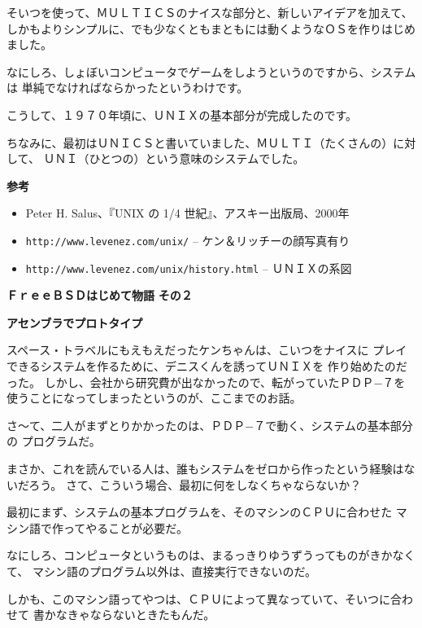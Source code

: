 \documentclass[12pt]{jarticle}
\begin{document}
そいつを使って、ＭＵＬＴＩＣＳのナイスな部分と、新しいアイデアを加えて、
しかもよりシンプルに、でも少なくともまともには動くようなＯＳを作りはじめました。

なにしろ、しょぼいコンピュータでゲームをしようというのですから、システムは
単純でなければならかったというわけです。

\bigskip

こうして、１９７０年頃に、ＵＮＩＸの基本部分が完成したのです。

ちなみに、最初はＵＮＩＣＳと書いていました、ＭＵＬＴＩ（たくさんの）に対して、
ＵＮＩ（ひとつの）という意味のシステムでした。

\bigskip
\textbf{参考}
\begin{itemize}
\item Peter H. Salus、『UNIX の 1/4 世紀』、アスキー出版局、2000年
\item \texttt{http://www.levenez.com/unix/} -- ケン＆リッチーの顔写真有り
\item \texttt{http://www.levenez.com/unix/history.html} -- ＵＮＩＸの系図
\end{itemize}
\newpage
\noindent
\textbf{\Huge ＦｒｅｅＢＳＤはじめて物語}
\hspace{1cm}
\textbf{\LARGE その２}

\bigskip

\textbf{\large アセンブラでプロトタイプ}

\bigskip
\bigskip

スペース・トラベルにもえもえだったケンちゃんは、こいつをナイスに
プレイできるシステムを作るために、デニスくんを誘ってＵＮＩＸを
作り始めたのだった。
しかし、会社から研究費が出なかったので、転がっていたＰＤＰ−７を
使うことになってしまったというのが、ここまでのお話。

\bigskip

さ〜て、二人がまずとりかかったのは、ＰＤＰ−７で動く、システムの基本部分の
プログラムだ。

まさか、これを読んでいる人は、誰もシステムをゼロから作ったという経験はないだろう。
さて、こういう場合、最初に何をしなくちゃならないか？

最初にまず、システムの基本プログラムを、そのマシンのＣＰＵに合わせた
マシン語で作ってやることが必要だ。

\bigskip

なにしろ、コンピュータというものは、まるっきりゆうずうってものがきかなくて、
マシン語のプログラム以外は、直接実行できないのだ。

しかも、このマシン語ってやつは、ＣＰＵによって異なっていて、そいつに合わせて
書かなきゃならないときたもんだ。
\end{document}
